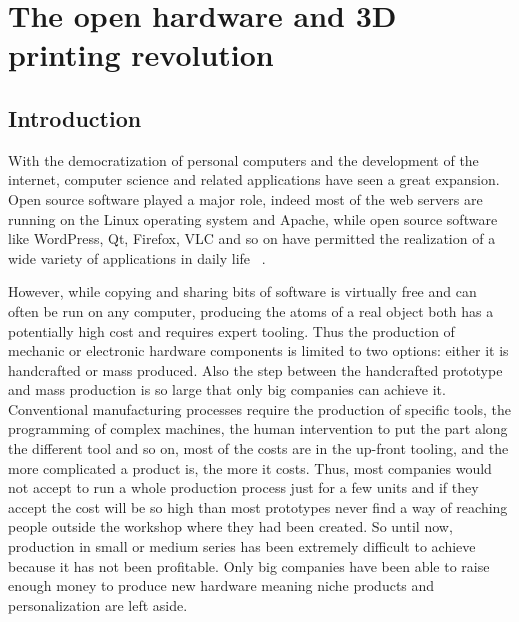 
\cleartoleftpage


\chapter{The open hardware and 3D printing revolution}



\section{Introduction} %

With the democratization of personal computers and the development of the internet, computer science and related applications have seen a great expansion. Open source software played a major role, indeed most of the web servers are running on the Linux operating system and Apache, while open source software like WordPress, Qt, Firefox, VLC and so on have permitted the realization of a wide variety of applications in daily life ~\cite{peeling2001analysis}.

However, while copying and sharing bits of software is virtually free and can often be run on any computer, producing the atoms of a real object both has a potentially high cost and requires expert tooling. Thus the production of mechanic or electronic hardware components is limited to two options: either it is handcrafted or mass produced. Also the step between the handcrafted prototype and mass production is so large that only big companies can achieve it. Conventional manufacturing processes require the production of specific tools, the programming of complex machines, the human intervention to put the part along the different tool and so on, most of the costs are in the up-front tooling, and the more complicated a product is, the more it costs. Thus, most companies would not accept to run a whole production process just for a few units and if they accept the cost will be so high than most prototypes never find a way of reaching people outside the workshop where they had been created. So until now, production in small or medium series has been extremely difficult to achieve because it has not been profitable.
Only big companies have been able to raise enough money to produce new hardware meaning niche products and personalization are left aside.

